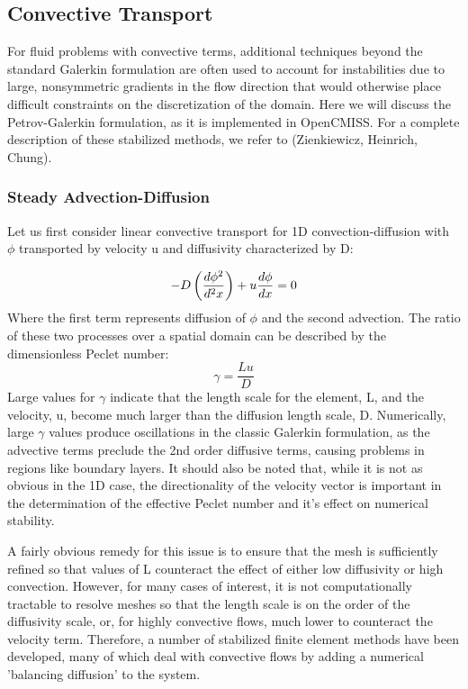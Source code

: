 \subsection{Convective Transport}

For fluid problems with convective terms, additional techniques beyond the standard Galerkin formulation are often used to account for instabilities due to large, nonsymmetric gradients in the flow direction that would otherwise place difficult constraints on the discretization of the domain. Here we will discuss the Petrov-Galerkin formulation, as it is implemented in OpenCMISS. For a complete description of these stabilized methods, we refer to (Zienkiewicz, Heinrich, Chung). 

\subsubsection{Steady Advection-Diffusion}

Let us first consider linear convective transport for 1D convection-diffusion with $\phi$ transported by velocity u and diffusivity characterized by D:

\begin{equation}
  -D\left( \frac{d\phi^2}{d^2x} \right)+u\frac{d\phi}{dx}=0
  \label{eqn:AdvectionDiffusion}
\end{equation}
Where the first term represents diffusion of $\phi$ and the second advection. The ratio of these two processes over a spatial domain can be described by the dimensionless Peclet number:
\begin{equation}
 \gamma=\frac{Lu}{D}
\end{equation}
Large values for $\gamma$ indicate that the length scale for the element, L, and the velocity, u, become much larger than the diffusion length scale, D. Numerically, large $\gamma$ values produce oscillations in the classic Galerkin formulation, as the advective terms preclude the 2nd order diffusive terms, causing problems in regions like boundary layers. It should also be noted that, while it is not as obvious in the 1D case, the directionality of the velocity vector is important in the determination of the effective Peclet number and it's effect on numerical stability.

A fairly obvious remedy for this issue is to ensure that the mesh is sufficiently refined so that values of L counteract the effect of either low diffusivity or high convection. However, for many cases of interest, it is not computationally tractable to resolve meshes so that the length scale is on the order of the diffusivity scale, or, for highly convective flows, much lower to counteract the velocity term. Therefore, a number of stabilized finite element methods have been developed, many of which deal with convective flows by adding a numerical 'balancing diffusion' to the system.

